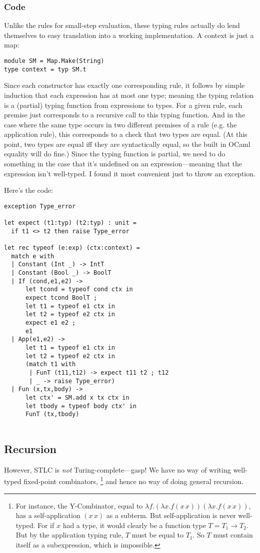 \documentclass[pageno]{jpaper}
\begin{document}
{\subsubsection{Code}
Unlike the rules for small-step evaluation, these typing rules actually do lend themselves to
easy translation into a working implementation. A context is just a map:
\begin{lstlisting}
module SM = Map.Make(String)
type context = typ SM.t
\end{lstlisting}

Since each constructor has exactly one corresponding rule, it follows by simple induction that
each expression has at most one type; meaning the typing relation is a (partial) typing function from expressions
to types. For a given rule, each premise just corresponds to a recursive call to this typing
function. And in the case where the same type occurs in two different premises of a rule (e.g. the application rule), this corresponds to a check that two types are equal. (At this point, two types are equal iff they are
syntactically equal, so the built in OCaml equality will do fine.)
Since the typing function is partial, we need to do something in the case that it's undefined on
an expression---meaning that the expression isn't well-typed.  I found it most convenient just to throw an
exception.

Here's the code:

\begin{lstlisting}
exception Type_error

let expect (t1:typ) (t2:typ) : unit =
  if t1 <> t2 then raise Type_error

let rec typeof (e:exp) (ctx:context) =
  match e with
  | Constant (Int _) -> IntT
  | Constant (Bool _) -> BoolT
  | If (cond,e1,e2) ->
      let tcond = typeof cond ctx in
      expect tcond BoolT ;
      let t1 = typeof e1 ctx in
      let t2 = typeof e2 ctx in
      expect e1 e2 ;
      e1
  | App(e1,e2) ->
      let t1 = typeof e1 ctx in
      let t2 = typeof e2 ctx in
      (match t1 with
       | FunT (t11,t12) -> expect t11 t2 ; t12
       | _ -> raise Type_error)
  | Fun (x,tx,body) ->
      let ctx' = SM.add x tx ctx in
      let tbody = typeof body ctx' in
      FunT (tx,tbody)
    
\end{lstlisting}
\subsection{Recursion}
However, STLC is \textit{not} Turing-complete---gasp!
We have no way of writing well-typed fixed-point combinators, \footnote{For instance, the Y-Combinator,
equal to $\lambda f. (\lambda x. f(x \,  x)) (\lambda x. f(x \, x))$, has a self-application $(x \, x)$
as a subterm.  But self-application is never well-typed. For if $x$ had a type, it would clearly
be a function type $T = T_1 \rightarrow T_2$. But by the application typing rule, $T$ must be equal
to $T_1$. So $T$ must contain itself as a subexpression, which is impossible.} and hence no way of doing general recursion.

}
\end{document}
